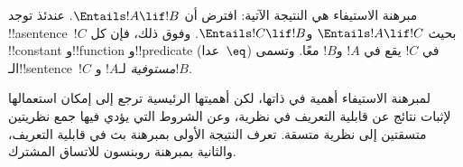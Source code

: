 \documentclass[../../../include/open-logic-section]{subfiles}
\begin{document}


مبرهنة الاستيفاء هي النتيجة الآتية: افترض أن
$\Entails !A \lif !B$. عندئذ توجد !!a{sentence}~$!C$ بحيث
$\Entails !A \lif !C$ و$\Entails !C \lif !B$. وفوق ذلك، فإن كل
!!{constant} و!!{function} و!!{predicate} (عدا~$\eq$) في $!C$ يقع في
$!A$ و$!B$ معًا. وتسمى الـ!!{sentence}~$!C$ \emph{مستوفية} لـ$!A$
و$!B$.

لمبرهنة الاستيفاء أهمية في ذاتها، لكن أهميتها الرئيسية ترجع إلى إمكان
استعمالها لإثبات نتائج عن قابلية التعريف في نظرية، وعن الشروط التي يؤدي
فيها جمع نظريتين متسقتين إلى نظرية متسقة. تعرف النتيجة الأولى بمبرهنة بث
في قابلية التعريف، والثانية بمبرهنة روبنسون للاتساق المشترك.
\end{document}
